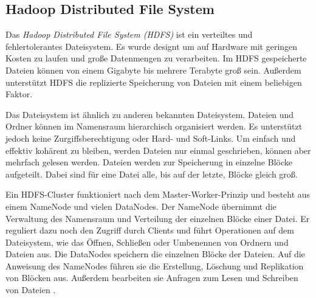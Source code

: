 \subsection{Hadoop Distributed File System}

Das \textit{Hadoop Distributed File System (HDFS)} ist ein verteiltes und fehlertolerantes Dateisystem.
Es wurde designt um auf Hardware mit geringen Kosten zu laufen und große Datenmengen zu verarbeiten.
Im HDFS gespeicherte Dateien können von einem Gigabyte bis mehrere Terabyte groß sein.
Außerdem unterstützt HDFS die replizierte Speicherung von Dateien mit einem beliebigen Faktor.

Das Dateisystem ist ähnlich zu anderen bekannten Dateisystem.
Dateien und Ordner können im Namensraum hierarchisch organisiert werden.
Es unterstützt jedoch keine Zurgiffsberechtigung oder Hard- und Soft-Links.
Um einfach und effektiv kohärent zu bleiben, werden Dateien nur einmal geschrieben, können aber mehrfach gelesen werden.
Dateien werden zur Speicherung in einzelne Blöcke aufgeteilt.
Dabei sind für eine Datei alle, bis auf der letzte, Blöcke gleich groß.

Ein HDFS-Cluster funktioniert nach dem Master-Worker-Prinzip und besteht aus einem NameNode und vielen DataNodes.
Der NameNode übernimmt die Verwaltung des Namensraum und Verteilung der einzelnen Blöcke einer Datei.
Er reguliert dazu noch den Zugriff durch Clients und führt Operationen auf dem Dateisystem, wie das Öffnen, Schließen oder Umbenennen von Ordnern und Dateien aus.
Die DataNodes speichern die einzelnen Blöcke der Dateien.
Auf die Anweisung des NameNodes führen sie die Erstellung, Löschung und Replikation von Blöcken aus.
Außerdem bearbeiten sie Anfragen zum Lesen und Schreiben von Dateien \parencite{hdfs}.